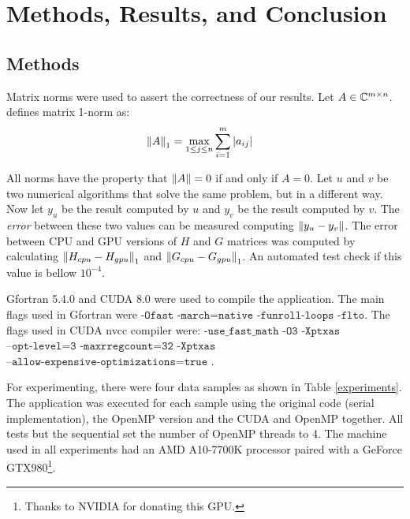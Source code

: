 \chapter{Methods, Results, and Conclusion}
\label{cap:conclusoes}

\section{Methods}

Matrix norms were used to assert the correctness of our results. 
Let %
$A \in \mathbb{C}^{m \times n}$. \cite{watkins:2004} defines  
matrix 1-norm as:
\begin{equation}
	\left\lVert A\right\rVert_{   1  } = \max\limits_{1 \leq j \leq n} \sum_{i=1}^{m} |a_{ij}| \quad
\end{equation}

All norms have the property that $\left\lVert A\right\rVert = 0$ if and only if $A = 0$.
Let $u$ and $v$ be two numerical 
algorithms that solve the same problem, but in a different way. 
Now let $y_u$ be the result computed by $u$ and $y_v$ be the result computed by
$v$. The \textit{error} between these two values can be measured computing
$\left\lVert y_u - y_v\right\rVert$. The error between CPU and GPU versions of $H$ and $G$ matrices was computed by calculating $\left\lVert H_{cpu} - H_{gpu}\right\rVert_1$
and $\left\lVert G_{cpu} - G_{gpu}\right\rVert_1$. An automated test check if this value is bellow $10^{-4}$.

Gfortran 5.4.0 and CUDA 8.0 were used to compile the application. The main flags used in Gfortran were
$\texttt{-Ofast}$ $\texttt{-march=native}$ $\texttt{-funroll-loops}$ $\texttt{-flto}$. The flags used in
CUDA nvcc compiler were: $\texttt{-use\_fast\_math}$  $\texttt{-O3}$ $\texttt{-Xptxas}$ $\texttt{--opt-level=3}$
$\texttt{-maxrregcount=32}$ $\texttt{-Xptxas}$ 
$\texttt{--allow-expensive-optimizations=true}$ . 

For experimenting, there were four data samples as shown in Table \ref{experiments}. The application was 
executed for each sample using the original code (serial implementation), the OpenMP 
version and the CUDA and OpenMP together. All tests but the sequential set the number of OpenMP 
threads to 4. The machine used in all experiments had an AMD A10-7700K processor paired with a 
GeForce GTX980\footnote{Thanks to NVIDIA for donating this GPU.}.


